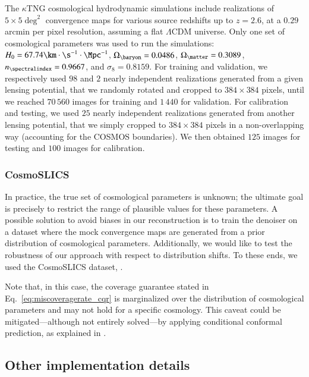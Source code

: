 \documentclass{aa}
\begin{document}
The $\kappa$TNG cosmological hydrodynamic simulations \citep{Osato2021} include realizations of $5 \times 5 \deg^2$ convergence maps for various source redshifts up to $z = 2.6$, at a $0.29$ arcmin per pixel resolution, assuming a flat $\Lambda$CDM universe. Only one set of cosmological parameters was used to run the simulations: $H_0 = 67.74 \km\cdot\s^{-1}\cdot\Mpc^{-1}$, $\Omega_{\baryon} = 0.0486$, $\Omega_{\matter} = 0.3089$, $n_{\spectralindex} = 0.9667$, and $\sigma_8 = 0.8159$. For training and validation, we respectively used $98$ and $2$ nearly independent realizations generated from a given lensing potential, that we randomly rotated and cropped to $384 \times 384$ pixels, until we reached $70\,560$ images for training and $1\,440$ for validation. For calibration and testing, we used $25$ nearly independent realizations generated from another lensing potential, that we simply cropped to $384 \times 384$ pixels in a non-overlapping way (accounting for the COSMOS boundaries). We then obtained $125$ images for testing and $100$ images for calibration. 

\subsubsection{CosmoSLICS}

In practice, the true set of cosmological parameters is unknown; the ultimate goal is precisely to restrict the range of plausible values for these parameters. A possible solution to avoid biases in our reconstruction is to train the denoiser on a dataset where the mock convergence maps are generated from a prior distribution of cosmological parameters. Additionally, we would like to test the robustness of our approach with respect to distribution shifts. To these ends, we used the CosmoSLICS dataset, .

Note that, in this case, the coverage guarantee stated in Eq.~\eqref{eq:miscoveragerate_cqr} is marginalized over the distribution of cosmological parameters and may not hold for a specific cosmology. This caveat could be mitigated---although not entirely solved---by applying conditional conformal prediction, as explained in \todo.

\subsection{Other implementation details}
\end{document}

